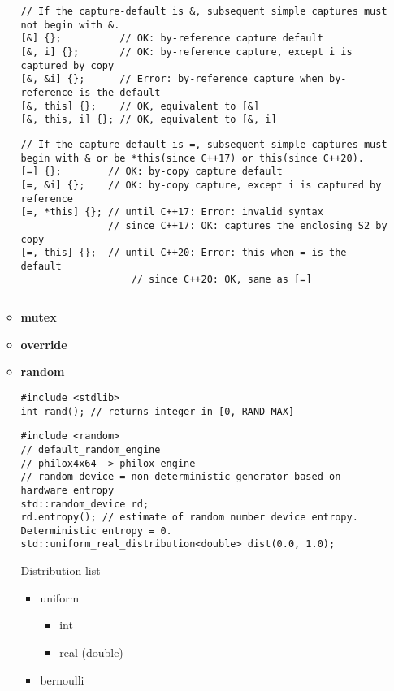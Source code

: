 \documentclass{article}
\begin{document}
\begin{itemize}
\begin{itemize}
\begin{lstlisting}[style=cpp]
// If the capture-default is &, subsequent simple captures must not begin with &. 
[&] {};          // OK: by-reference capture default
[&, i] {};       // OK: by-reference capture, except i is captured by copy
[&, &i] {};      // Error: by-reference capture when by-reference is the default
[&, this] {};    // OK, equivalent to [&]
[&, this, i] {}; // OK, equivalent to [&, i]
         \end{lstlisting}
            \begin{lstlisting}[style=cpp]
// If the capture-default is =, subsequent simple captures must begin with & or be *this(since C++17) or this(since C++20). 
[=] {};        // OK: by-copy capture default
[=, &i] {};    // OK: by-copy capture, except i is captured by reference
[=, *this] {}; // until C++17: Error: invalid syntax
               // since C++17: OK: captures the enclosing S2 by copy
[=, this] {};  // until C++20: Error: this when = is the default
                   // since C++20: OK, same as [=]
         \end{lstlisting}
            \begin{lstlisting}[style=cpp]
         \end{lstlisting}
          \item \textbf{mutex}
          \item \textbf{override}
          \item \textbf{random}
            \begin{lstlisting}[style=cpp]
#include <stdlib>
int rand(); // returns integer in [0, RAND_MAX]
         \end{lstlisting}
            \begin{lstlisting}[style=cpp]
#include <random>
// default_random_engine
// philox4x64 -> philox_engine
// random_device = non-deterministic generator based on hardware entropy
std::random_device rd;
rd.entropy(); // estimate of random number device entropy. Deterministic entropy = 0.
std::uniform_real_distribution<double> dist(0.0, 1.0);
         \end{lstlisting}
            Distribution list
            \begin{itemize}
              \item uniform
                \begin{itemize}
                  \item int
                  \item real (double)
                \end{itemize}
              \item bernoulli

\end{itemize}
\end{itemize}
\end{itemize}
\end{document}
